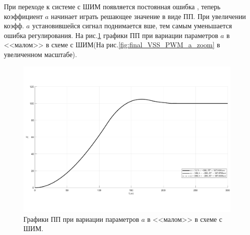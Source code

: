 %
При переходе к системе с ШИМ появляется постоянная ошибка
, теперь коэффициент $a$ начинает играть решающее значение в виде ПП. При увеличении коэфф. $a$ установившейся сигнал поднимается вше, тем самым уменьшается ошибка регулирования. На рис.\ref{fig:final_VSS_PWM_a} графики ПП при вариации параметров $a$ в <<малом>> в схеме с ШИМ(На рис.\ref{fig:final_VSS_PWM_a_zoom} в увеличенном масштабе).
\begin{figure}[!h]\centering
	\includegraphics[width=1\linewidth]{images/final_VSS_PWM_a}
	\caption{ Графики ПП при вариации параметров $a$ в <<малом>> в схеме с ШИМ.}\label{fig:final_VSS_PWM_a}
\end{figure}
